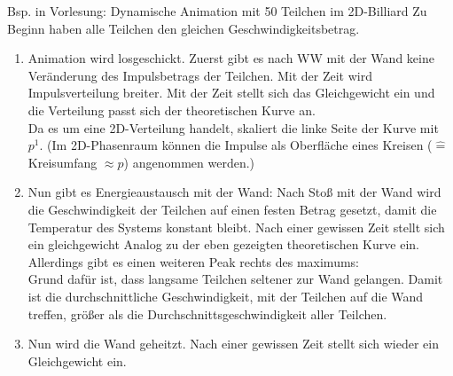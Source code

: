 \begin{beispiel}{Bsp. in Vorlesung: Dynamische Animation mit 50 Teilchen im 2D-Billiard}
Zu Beginn haben alle Teilchen den gleichen Geschwindigkeitsbetrag.
    \begin{enumerate}
        \item Animation wird losgeschickt. Zuerst gibt es nach WW mit der Wand keine Veränderung des Impulsbetrags der Teilchen. Mit der Zeit wird Impulsverteilung breiter. Mit der Zeit stellt sich das Gleichgewicht ein und die Verteilung passt sich der theoretischen Kurve an.\\
        Da es um eine 2D-Verteilung handelt, skaliert die linke Seite der Kurve mit $p^1$. (Im 2D-Phasenraum können die Impulse als Oberfläche eines Kreisen ($\widehat{=}$ Kreisumfang $\approx p$) angenommen werden.)
  \begin{center}
\end{center}
        

\item Nun gibt es Energieaustausch mit der Wand: Nach Stoß mit der Wand wird die Geschwindigkeit der Teilchen auf einen festen Betrag gesetzt, damit die Temperatur des Systems konstant bleibt. Nach einer gewissen Zeit stellt sich ein gleichgewicht Analog zu der eben gezeigten theoretischen Kurve ein. Allerdings gibt es einen weiteren Peak rechts des maximums: \\
Grund dafür ist, dass langsame Teilchen seltener zur Wand gelangen. Damit ist die durchschnittliche Geschwindigkeit, mit der Teilchen auf die Wand treffen, größer als die Durchschnittsgeschwindigkeit aller Teilchen.
\item Nun wird die Wand geheitzt. Nach einer gewissen Zeit stellt sich wieder ein Gleichgewicht ein.
        

\end{enumerate}
\end{beispiel}
